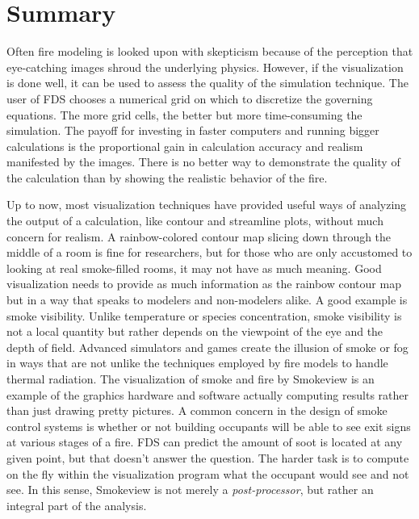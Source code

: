 \documentclass[11pt,twoside]{book}
\begin{document}






\chapter{Summary}
Often fire modeling is looked upon with skepticism because of the
perception that eye-catching images shroud the underlying physics.
However, if the visualization is done well, it can be used to
assess the quality of the simulation technique. The user of FDS
chooses a numerical grid on which to discretize the governing
equations. The more grid cells, the better but more time-consuming
the simulation. The payoff for investing in faster computers and
running bigger calculations is the proportional gain in calculation accuracy and realism
manifested by the images. There is no better way to demonstrate
the quality of the calculation than by showing the realistic
behavior of the fire.

Up to now, most visualization techniques have provided useful ways
of analyzing the output of a calculation, like contour and
streamline plots, without much concern for realism. A
rainbow-colored contour map slicing down through the middle of a
room is fine for researchers, but for those who are only
accustomed to looking at real smoke-filled rooms, it may not have
as much meaning. Good visualization needs to provide as much
information as the rainbow contour map but in a way that speaks to
modelers and non-modelers alike. A good example is smoke
visibility. Unlike temperature or species concentration, smoke
visibility is not a local quantity but rather depends on the
viewpoint of the eye and the depth of field. Advanced simulators
and games create the illusion of smoke or fog in ways that are not
unlike the techniques employed by fire models to handle thermal
radiation. The visualization of smoke and fire by Smokeview is an
example of the graphics hardware and software actually computing
results rather than just drawing pretty pictures. A common concern
in the design of smoke control systems is whether or not building
occupants will be able to see exit signs at various stages of a
fire. FDS can predict the amount of soot is located at any given
point, but that doesn't answer the question. The harder task is to
compute on the fly within the visualization program what the
occupant would see and not see. In this sense, Smokeview is not
merely a {\em post-processor}, but rather an integral part of the
analysis.
\end{document}
